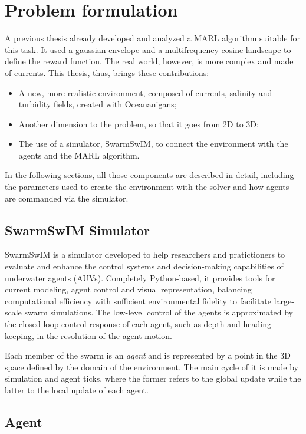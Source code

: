 \chapter{Problem formulation}

A previous thesis \cite{insaghi2025thesis} already developed and analyzed 
a MARL algorithm suitable for this task. It used a gaussian envelope and a multifrequency cosine landscape to define the reward function. The real world, however, is 
more complex and made of currents. This thesis, thus, brings these contributions:
\begin{itemize}
    \item A new, more realistic environment, composed of currents, salinity and turbidity fields, created with Oceananigans;
    \item Another dimension to the problem, so that it goes from 2D to 3D;
    \item The use of a simulator, SwarmSwIM, to connect the environment with the agents and the MARL algorithm.
\end{itemize}

In the following sections, all those components are described in detail, 
including the parameters used to create the environment with the solver
and how agents are commanded via the simulator.

\section{SwarmSwIM Simulator}

SwarmSwIM \cite{swim_simulator} is a simulator developed to help researchers
and pratictioners to evaluate and enhance the control systems and decision-making
capabilities of underwater agents (AUVs). Completely Python-based, it provides
tools for current modeling, agent control and visual representation, balancing 
computational efficiency with sufficient environmental fidelity to facilitate large-scale
swarm simulations. The low-level control of the agents is approximated by the 
closed-loop control response of each agent, such as depth and heading keeping, in the 
resolution of the agent motion. 

Each member of the swarm is an \textit{agent} and is represented by a point
in the 3D space defined by the domain of the environment. The main cycle of it 
is made by simulation and agent ticks, where the former refers to the global update
while the latter to the local update of each agent. 

\section{Agent}

